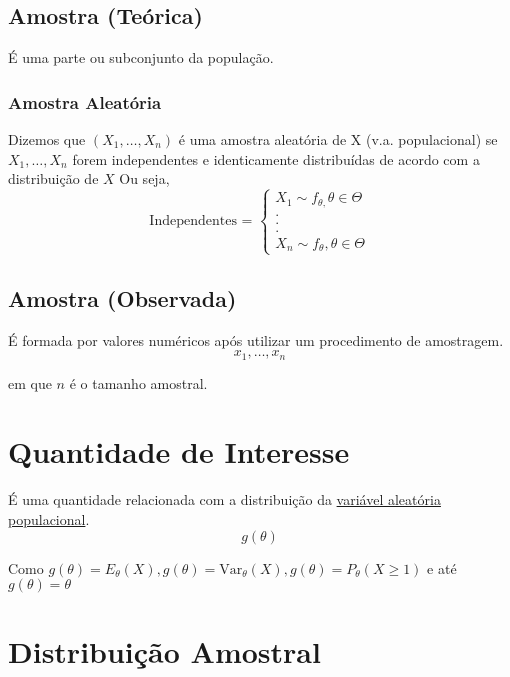 \documentclass[
  letterpaper,
  DIV=11,
  numbers=noendperiod]{scrreprt}
\begin{document}
\section{Amostra (Teórica)}\label{amostra-teuxf3rica}

É uma parte ou subconjunto da população.

\subsection{Amostra Aleatória}\label{sec-aa}

Dizemos que \((X_{1},\dots,X_{n})\) é uma amostra aleatória de X (v.a.
populacional) se \(X_{1},\dots,X_{n}\) forem independentes e
identicamente distribuídas de acordo com a distribuição de \(X\) Ou
seja, \[
\text{Independentes = }\begin{cases}X_{1}\sim f_{\theta,}\theta \in \Theta \\
. \\
. \\
. \\
X_{n} \sim f_{\theta}, \theta \in \Theta
\end{cases}
\]

\section{Amostra (Observada)}\label{sec-ao}

É formada por valores numéricos após utilizar um procedimento de
amostragem. \[
x_{1},\dots,x_{n}
\]

em que \(n\) é o tamanho amostral.


\chapter{Quantidade de Interesse}\label{quantidade-de-interesse}

É uma quantidade relacionada com a distribuição da
\hyperref[sec-vp]{variável aleatória populacional}. \[
g(\theta)
\]

Como
\(g(\theta) = E_\theta(X), g(\theta)= \mathrm{Var}_\theta(X), g(\theta)=P_\theta(X\geq1)\)
e até \(g(\theta)=\theta\)


\chapter{Distribuição Amostral}\label{distribuiuxe7uxe3o-amostral}
\end{document}
